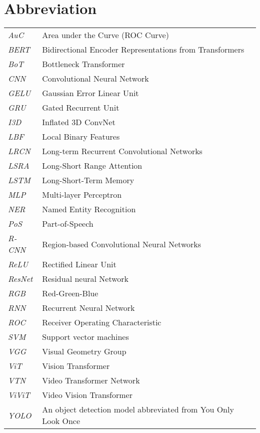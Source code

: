 \newpage
\makeatletter
\let\mcnewpage=\newpage
\newcommand{\TrickSupertabularIntoMulticols}{%
  \renewcommand\newpage{%
    \if@firstcolumn
      \hrule width\linewidth height0pt
      \columnbreak
    \else
      \mcnewpage
    \fi
  }%
}
\makeatother
\chapter{Abbreviation}
\begin{changemargin}{-0.5cm}{0cm}
\begin{multicols*}{2}
\TrickSupertabularIntoMulticols
\begin{supertabular}{>{\em}lp{6.2cm}}
AuC & Area under the Curve (ROC Curve) \\ [.5em]
BERT & Bidirectional Encoder Representations from Transformers \\ [.5em]
BoT & Bottleneck Transformer \\ [.5em]
CNN & Convolutional Neural Network \\ [.5em]
GELU & Gaussian Error Linear Unit \\ [.5em]
GRU & Gated Recurrent Unit \\ [.5em]
I3D & Inflated 3D ConvNet \\ [.5em]
LBF & Local Binary Features \\ [.5em]
LRCN & Long-term Recurrent Convolutional Networks \\ [.5em]
LSRA & Long-Short Range Attention \\ [.5em]
LSTM & Long-Short-Term Memory \\ [.5em]
MLP & Multi-layer Perceptron \\ [.5em]
NER & Named Entity Recognition \\ [.5em]
PoS & Part-of-Speech \\ [.5em]
R-CNN & Region-based Convolutional Neural Networks \\ [.5em]
ReLU & Rectified Linear Unit \\ [.5em]
ResNet & Residual neural Network \\ [.5em]
RGB & Red-Green-Blue \\ [.5em]
RNN & Recurrent Neural Network \\ [.5em]
ROC & Receiver Operating Characteristic \\ [.5em]
SVM & Support vector machines \\ [.5em]
VGG & Visual Geometry Group \\ [.5em]
ViT & Vision Transformer \\ [.5em]
VTN & Video Transformer Network \\ [.5em]
ViViT & Video Vision Transformer \\ [.5em]
YOLO & An object detection model abbreviated from You Only Look Once \\ [.5em]
\end{supertabular}
\end{multicols*}
\end{changemargin}